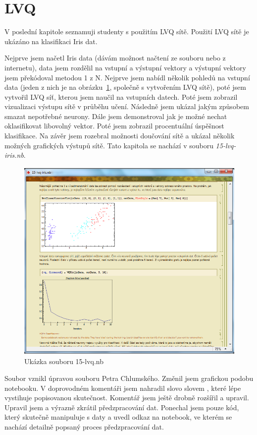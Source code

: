 \documentclass[11pt,twoside,a4paper]{book}
\begin{document}
\section{LVQ}
V poslední kapitole seznamuji studenty s použitím LVQ sítě. Použití LVQ sítě je ukázáno na klasifikaci Iris dat.

Nejprve jsem načetl Iris data (dávám možnost načtení ze souboru nebo z internetu), data jsem rozdělil na vstupní a výstupní vektory a výstupní vektory jsem překódoval metodou 1 z N. Nejprve jsem nabídl několik pohledů na vstupní data (jeden z nich je na obrázku~\ref{fig:lvq}, společně s vytvořením LVQ sítě), poté jsem vytvořil LVQ síť, kterou jsem naučil na vstupních datech. Poté jsem zobrazil vizualizaci výstupu sítě v průběhu učení. Následně jsem ukázal jakým způsobem smazat nepotřebné neurony. Dále jsem demonstroval jak je možné nechat oklasifikovat libovolný vektor. Poté jsem zobrazil procentuální úspěšnost klasifikace. Na závěr jsem rozebral možnosti doučování sítě a ukázal několik možných grafických výstupů sítě. Tato kapitola se nachází v souboru \textit{15-lvq-iris.nb}.

\begin{figure}[h!]
\begin{center}
\includegraphics[height=10cm]{figures/ukazka15.png}
\caption{Ukázka souboru 15-lvq.nb}
\label{fig:lvq}
\end{center}
\end{figure}

Soubor vznikl úpravou souboru Petra Chlumského.\cite{chlumsky} Změnil jsem grafickou podobu notebooku. V doprovodném komentáři jsem nahradil slovo  slovem , které lépe vystihuje popisovanou skutečnost. Komentář jsem ještě drobně rozšířil a upravil. Upravil jsem a výrazně zkrátil předzpracování dat. Ponechal jsem pouze kód, který skutečně manipuluje s daty a uvedl odkaz na notebook, ve kterém se nachází detailně popsaný proces předzpracování dat. 
\end{document}
